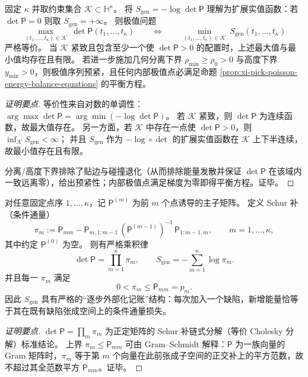 

\begin{proposition}\label{prop:xi-pick-poisson-weighted-fekete-variational}
固定 \(\kappa\) 并取约束集合 \(\mathcal{K}\subset\mathbb{H}^{\kappa}\)。
将 \(S_{\mathrm{gen}}=-\log\det\mathsf P\) 理解为扩展实值函数：若 \(\det\mathsf P=0\) 则取 \(S_{\mathrm{gen}}=+\infty\)。
则极值问题
\[
\max_{(t_1,\dots,t_\kappa)\in\mathcal{K}}\ \det\mathsf P(t_1,\dots,t_\kappa)
\qquad\Longleftrightarrow\qquad
\min_{(t_1,\dots,t_\kappa)\in\mathcal{K}}\ S_{\mathrm{gen}}(t_1,\dots,t_\kappa)
\]
严格等价。
当 \(\mathcal{K}\) 紧致且包含至少一个使 \(\det\mathsf P>0\) 的配置时，上述最大值与最小值均存在且有限。
若进一步施加几何分离下界 \(\rho_{\min}\ge\rho_0>0\) 与高度下界 \(y_{\min}>0\)，则极值序列预紧，且任何内部极值点必满足命题 \ref{prop:xi-pick-poisson-energy-balance-equations} 的平衡方程。
\end{proposition}
\begin{proof}[证明要点]
等价性来自对数的单调性：
\(
\arg\max\det\mathsf P=\arg\min(-\log\det\mathsf P)
\)。
若 \(\mathcal{K}\) 紧致，则 \(\det\mathsf P\) 为连续函数，故最大值存在。
另一方面，若 \(\mathcal{K}\) 中存在一点使 \(\det\mathsf P>0\)，则 \(\inf_{\mathcal{K}}S_{\mathrm{gen}}<\infty\)；
并且 \(S_{\mathrm{gen}}\) 作为 \(-\log\circ\det\) 的扩展实值函数在 \(\mathcal{K}\) 上下半连续，故最小值存在且有限。
\par
分离/高度下界排除了贴边与碰撞退化（从而排除能量发散并保证 \(\det\mathsf P\) 在该域内一致远离零），给出预紧性；内部极值点满足梯度为零即得平衡方程。证毕。
\end{proof}

\begin{proposition}\label{prop:xi-pick-poisson-schur-flux-ledger}
对任意固定点序 \(1,\dots,\kappa\)，记 \(\mathsf P^{(m)}\) 为前 \(m\) 个点诱导的主子矩阵。
定义 Schur 补（条件通量）
\[
\pi_m
:=
\mathsf P_{mm}-\mathsf P_{m,1:m-1}\,(\mathsf P^{(m-1)})^{-1}\,\mathsf P_{1:m-1,m},
\qquad
m=1,\dots,\kappa,
\]
其中约定 \(\mathsf P^{(0)}\) 为空。
则有严格乘积律
\[
\boxed{\;
\det\mathsf P=\prod_{m=1}^{\kappa}\pi_m,
\qquad
S_{\mathrm{gen}}=-\sum_{m=1}^{\kappa}\log\pi_m.\;}
\]
并且每一 \(\pi_m\) 满足
\[
\boxed{\;
0<\pi_m\le \mathsf P_{mm}=p_m.\;}
\]
因此 \(S_{\mathrm{gen}}\) 具有严格的“逐步外部化记账”结构：每次加入一个缺陷，新增能量恰等于其在既有缺陷张成空间上的条件通量损失。
\end{proposition}
\begin{proof}[证明要点]
\(\det\mathsf P=\prod_m\pi_m\) 为正定矩阵的 Schur 补链式分解（等价 Cholesky 分解）标准结论。
上界 \(\pi_m\le \mathsf P_{mm}\) 可由 Gram--Schmidt 解释：\(\mathsf P\) 为一族向量的 Gram 矩阵时，\(\pi_m\) 等于第 \(m\) 个向量在此前张成子空间的正交补上的平方范数，故不超过其全范数平方 \(\mathsf P_{mm}\)。证毕。
\end{proof}

